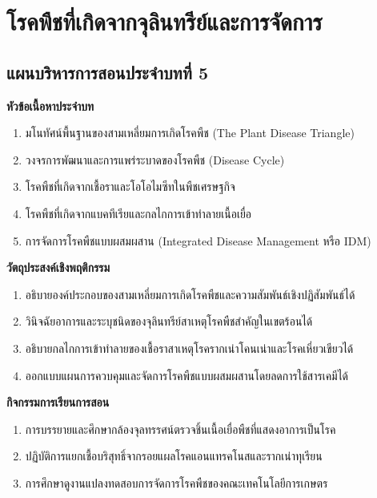 \chapter{โรคพืชที่เกิดจากจุลินทรีย์และการจัดการ}
\label{chap:ch05}

\section*{แผนบริหารการสอนประจำบทที่ 5}

\noindent\textbf{หัวข้อเนื้อหาประจำบท}
\begin{enumerate}
    \item มโนทัศน์พื้นฐานของสามเหลี่ยมการเกิดโรคพืช (The Plant Disease Triangle)
    \item วงจรการพัฒนาและการแพร่ระบาดของโรคพืช (Disease Cycle)
    \item โรคพืชที่เกิดจากเชื้อราและโอโอไมซีทในพืชเศรษฐกิจ
    \item โรคพืชที่เกิดจากแบคทีเรียและกลไกการเข้าทำลายเนื้อเยื่อ
    \item การจัดการโรคพืชแบบผสมผสาน (Integrated Disease Management หรือ IDM)
\end{enumerate}

\noindent\textbf{วัตถุประสงค์เชิงพฤติกรรม}
\begin{enumerate}
    \item อธิบายองค์ประกอบของสามเหลี่ยมการเกิดโรคพืชและความสัมพันธ์เชิงปฏิสัมพันธ์ได้
    \item วินิจฉัยอาการและระบุชนิดของจุลินทรีย์สาเหตุโรคพืชสำคัญในเขตร้อนได้
    \item อธิบายกลไกการเข้าทำลายของเชื้อราสาเหตุโรครากเน่าโคนเน่าและโรคเหี่ยวเขียวได้
    \item ออกแบบแผนการควบคุมและจัดการโรคพืชแบบผสมผสานโดยลดการใช้สารเคมีได้
\end{enumerate}

\noindent\textbf{กิจกรรมการเรียนการสอน}
\begin{enumerate}
    \item การบรรยายและศึกษากล้องจุลทรรศน์ตรวจชิ้นเนื้อเยื่อพืชที่แสดงอาการเป็นโรค
    \item ปฏิบัติการแยกเชื้อบริสุทธิ์จากรอยแผลโรคแอนแทรคโนสและรากเน่าทุเรียน
    \item การศึกษาดูงานแปลงทดสอบการจัดการโรคพืชของคณะเทคโนโลยีการเกษตร
\end{enumerate}

